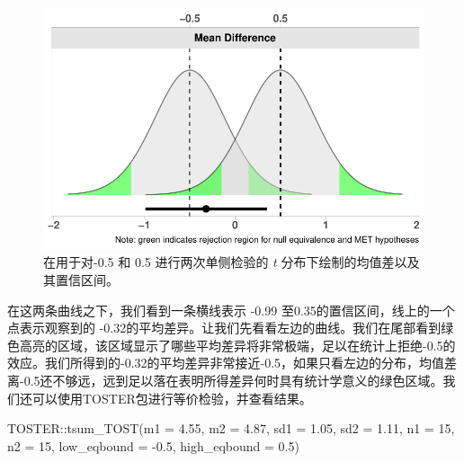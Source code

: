 \documentclass[
  letterpaper,
  DIV=11,
  numbers=noendperiod]{scrreprt}
\newenvironment{Shaded}{\begin{snugshade}}{\end{snugshade}}
\newcommand{\AttributeTok}[1]{\textcolor[rgb]{0.40,0.45,0.13}{#1}}
\newcommand{\DecValTok}[1]{\textcolor[rgb]{0.68,0.00,0.00}{#1}}
\newcommand{\FloatTok}[1]{\textcolor[rgb]{0.68,0.00,0.00}{#1}}
\newcommand{\FunctionTok}[1]{\textcolor[rgb]{0.28,0.35,0.67}{#1}}
\newcommand{\NormalTok}[1]{\textcolor[rgb]{0.00,0.23,0.31}{#1}}
\newcommand{\SpecialCharTok}[1]{\textcolor[rgb]{0.37,0.37,0.37}{#1}}
\begin{document}
\begin{figure}

{\centering \includegraphics[width=1\textwidth,height=\textheight]{09-equivalencetest_files/figure-pdf/fig-tdistequivalence-1.pdf}

}

\caption{\label{fig-tdistequivalence}在用于对-0.5 和 0.5
进行两次单侧检验的 \emph{t} 分布下绘制的均值差以及其置信区间。}

\end{figure}

在这两条曲线之下，我们看到一条横线表示 -0.99
至0.35的置信区间，线上的一个点表示观察到的
-0.32的平均差异。让我们先看看左边的曲线。我们在尾部看到绿色高亮的区域，该区域显示了哪些平均差异将非常极端，足以在统计上拒绝-0.5的效应。我们所得到的-0.32的平均差异非常接近-0.5，如果只看左边的分布，均值差离-0.5还不够远，远到足以落在表明所得差异何时具有统计学意义的绿色区域。我们还可以使用TOSTER包进行等价检验，并查看结果。

\begin{Shaded}
\begin{Highlighting}[]
\NormalTok{TOSTER}\SpecialCharTok{::}\FunctionTok{tsum\_TOST}\NormalTok{(}\AttributeTok{m1 =} \FloatTok{4.55}\NormalTok{, }
                  \AttributeTok{m2 =} \FloatTok{4.87}\NormalTok{, }
                  \AttributeTok{sd1 =} \FloatTok{1.05}\NormalTok{, }
                  \AttributeTok{sd2 =} \FloatTok{1.11}\NormalTok{,}
                  \AttributeTok{n1 =} \DecValTok{15}\NormalTok{, }
                  \AttributeTok{n2 =} \DecValTok{15}\NormalTok{, }
                  \AttributeTok{low\_eqbound =} \SpecialCharTok{{-}}\FloatTok{0.5}\NormalTok{, }
                  \AttributeTok{high\_eqbound =} \FloatTok{0.5}\NormalTok{)}
\end{Highlighting}
\end{Shaded}
\end{document}
